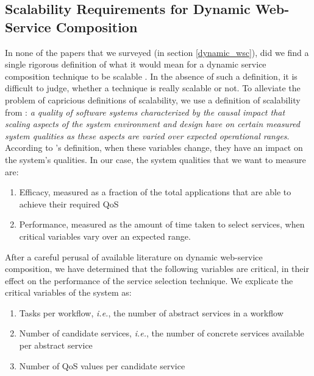 \documentclass[10pt,journal,compsoc]{IEEEtran}
\begin{document}
\subsection{Scalability Requirements for Dynamic Web-Service Composition}
In none of the papers that we surveyed (in section \ref{dynamic_wsc}), did we find a single rigorous definition of what it would mean for a dynamic service composition technique to be scalable . In the absence of such a definition, it is difficult to judge, whether a technique is really scalable or not. To alleviate the problem of capricious definitions of scalability, we use a definition of scalability from \cite{Duboc2007framework}: \textit{a quality of software systems characterized by the causal impact that scaling aspects of the system environment and design have on certain measured system qualities as these aspects are varied over expected operational ranges}.\\
According to \cite{Duboc2007framework}'s definition, when these variables change, they have an impact on the system's qualities. In our case, the system qualities that we want to measure are:
	\begin{enumerate}
		\item Efficacy, measured as a fraction of the total applications that are able to achieve their required QoS
		\item Performance, measured as the amount of time taken to select services, when critical variables vary over an expected range.
	\end{enumerate}	 
After a careful perusal of available literature on dynamic web-service composition, we have determined that the following variables are critical, in their effect on the performance of the service selection technique. We explicate the critical variables of the system as:
	\begin{enumerate}
		\item Tasks per workflow, \textit{i.e.}, the number of abstract services in a workflow
		\item Number of candidate services, \textit{i.e.}, the number of concrete services available per abstract service
		\item Number of QoS values per candidate service
	\end{enumerate}
	
\end{document}
